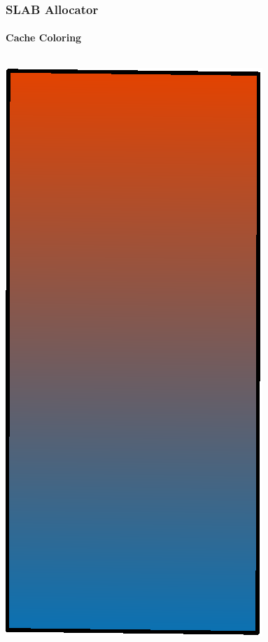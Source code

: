\begin{frame}
\frametitle{SLAB Allocator}
\framesubtitle{Cache Coloring}

\begin{columns}[T]

  \begin{column}{.3\textwidth}
    \includegraphics[width=.8\linewidth]{obj-hotmap}
  \end{column}


\end{columns}
\end{frame}
